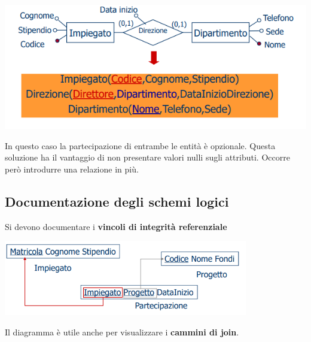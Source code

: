 \documentclass[12pt]{article}
\begin{document}
\begin{center}
    \includegraphics[width = 1\textwidth]{Images/121.PNG}
\end{center}
In questo caso la partecipazione di entrambe le entità è opzionale.
Questa soluzione ha il vantaggio di non presentare valori nulli sugli attributi.
Occorre però introdurre una relazione in più.
\subsection{Documentazione degli schemi logici}
Si devono documentare i \textbf{vincoli di integrità referenziale}
\begin{center}
    \includegraphics[width = 0.80\textwidth]{Images/122.PNG}
\end{center}
Il diagramma è utile anche per visualizzare i \textbf{cammini di join}.
\end{document}
